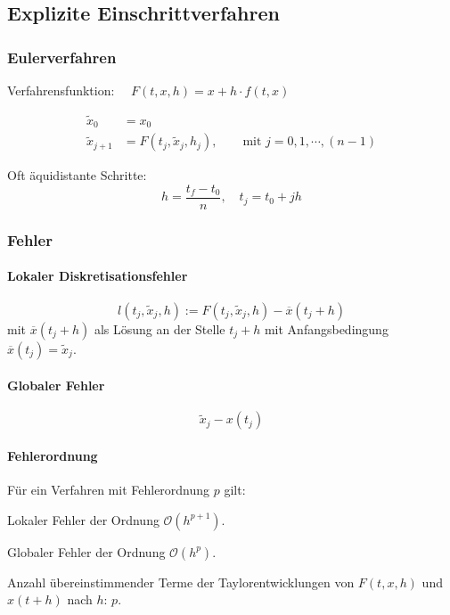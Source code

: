 	\subsection{Explizite Einschrittverfahren}
		\subsubsection{Eulerverfahren}
			Verfahrensfunktion: $\quad F(t,x,h) = x + h\cdot f(t,x)$

			\begin{algo}
				\begin{align*}
					\tilde x_0 &= x_0 \\
					\tilde x_{j+1} &= F(t_j,\tilde x_j, h_j), \qquad \text{mit } j=0,1,\cdots, (n-1)
				\end{align*}

				Oft äquidistante Schritte:
				\[
					h=\frac{t_f-t_0}{n}, \quad t_j = t_0 + jh
				\]
			\end{algo}

		\subsubsection{Fehler}
			\paragraph{Lokaler Diskretisationsfehler}
				\[
					l(t_j,\tilde x_j,h) := F(t_j,\tilde x_j, h)-\overline{x}(t_j+h)
				\]
				mit $\overline{x}(t_j+h)$ als Lösung an der Stelle $t_j+h$ mit Anfangsbedingung $\overline{x}(t_j)=\tilde x_j$.

			\paragraph{Globaler Fehler}
				\[
					\tilde x_j - x(t_j)
				\]

			\paragraph{Fehlerordnung} Für ein Verfahren mit Fehlerordnung $p$ gilt:
				\begin{tightitemize}
					\item Lokaler Fehler der Ordnung $\mathcal{O}\left(h^{p+1}\right)$.
					\item Globaler Fehler der Ordnung $\mathcal{O}\left(h^{p}\right)$.
					\item Anzahl übereinstimmender Terme der Taylorentwicklungen von $F(t,x,h)$ und $x(t+h)$ nach $h$: $p$.
				\end{tightitemize}

